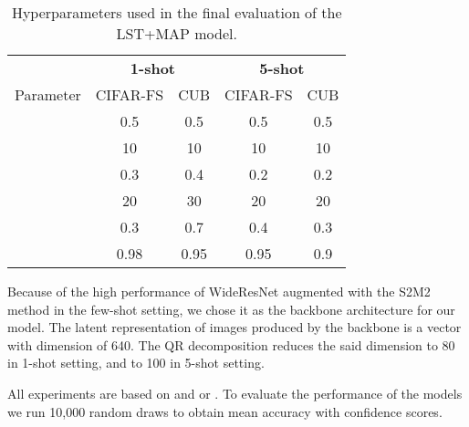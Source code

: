 \documentclass[letterpaper]{article} \usepackage{aaai20}  \usepackage{times}  \usepackage{helvet} \usepackage{courier}  \usepackage[hyphens]{url}  \usepackage{graphicx} \urlstyle{rm} \def\UrlFont{\rm}  \usepackage{graphicx}  \frenchspacing  \setlength{\pdfpagewidth}{8.5in}  \setlength{\pdfpageheight}{11in}  \usepackage[ruled,vlined]{algorithm2e}
\begin{document}
\begin{table}[]
\caption{Hyperparameters used in the final evaluation of the LST+MAP model.}
\vspace{5mm}
\label{tab:hyperparams}
\centering
\begin{tabular}{c|cc|cc}
\hline
         & \multicolumn{2}{c|}{\textbf{1-shot}} & \multicolumn{2}{c}{\textbf{5-shot}} \\ \cline{2-5} 
Parameter & CIFAR-FS            & CUB            & CIFAR-FS            & CUB            \\ \hline
 & 0.5                 & 0.5            & 0.5                 & 0.5            \\ \hline
 & 10                 & 10            & 10                 & 10            \\ \hline
 & 0.3                 & 0.4            & 0.2                 & 0.2            \\ \hline
 & 20                 & 30            & 20                 & 20            \\ \hline
 & 0.3                 & 0.7            & 0.4                 & 0.3            \\ \hline
 & 0.98                & 0.95           & 0.95                & 0.9  \\ \hline         
\end{tabular}
\end{table}


Because of the high performance of WideResNet \cite{zagoruyko2017wide} augmented with the S2M2 method \cite{mangla2020charting} in the few-shot setting, we chose it as the backbone architecture for our model. The latent representation of images produced by the backbone is a vector with dimension of 640. The QR decomposition reduces the said dimension to 80 in 1-shot setting, and to 100 in 5-shot setting.

All experiments are based on  and  or . To evaluate the performance of the models we run 10,000 random draws to obtain mean accuracy with  confidence scores. 
\end{document}
